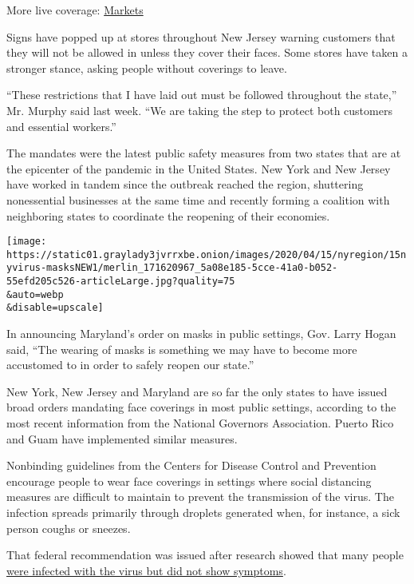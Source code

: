 More live coverage:
\href{https://www.nytimes3xbfgragh.onion/live/2020/09/11/business/stock-market-today-coronavirus?action=click\&pgtype=Article\&state=default\&region=MAIN_CONTENT_1\&context=storylines_live_updates}{Markets}

Signs have popped up at stores throughout New Jersey warning customers
that they will not be allowed in unless they cover their faces. Some
stores have taken a stronger stance, asking people without coverings to
leave.

``These restrictions that I have laid out must be followed throughout
the state,'' Mr. Murphy said last week. ``We are taking the step to
protect both customers and essential workers.''

The mandates were the latest public safety measures from two states that
are at the epicenter of the pandemic in the United States. New York and
New Jersey have worked in tandem since the outbreak reached the region,
shuttering nonessential businesses at the same time and recently forming
a coalition with neighboring states to coordinate the reopening of their
economies.

\texttt{[image: https://static01.graylady3jvrrxbe.onion/images/2020/04/15/nyregion/15nyvirus-masksNEW1/merlin\_171620967\_5a08e185-5cce-41a0-b052-55efd205c526-articleLarge.jpg?quality=75\\\&auto=webp\\\&disable=upscale]}

In announcing Maryland's order on masks in public settings, Gov. Larry
Hogan said, ``The wearing of masks is something we may have to become
more accustomed to in order to safely reopen our state.''

New York, New Jersey and Maryland are so far the only states to have
issued broad orders mandating face coverings in most public settings,
according to the most recent information from the National Governors
Association. Puerto Rico and Guam have implemented similar measures.

Nonbinding guidelines from the Centers for Disease Control and
Prevention encourage people to wear face coverings in settings where
social distancing measures are difficult to maintain to prevent the
transmission of the virus. The infection spreads primarily through
droplets generated when, for instance, a sick person coughs or sneezes.

That federal recommendation was issued after research showed that many
people
\href{https://www.nytimes3xbfgragh.onion/2020/03/31/health/coronavirus-asymptomatic-transmission.html}{were
infected with the virus but did not show symptoms}.

